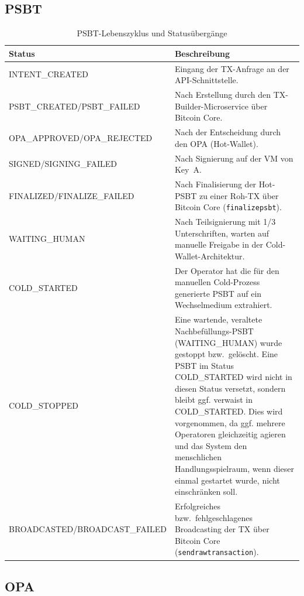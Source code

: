 \subsection{PSBT}

\begin{table}[H]
\centering
\footnotesize
\renewcommand{\arraystretch}{1.3}
\begin{tabularx}{\linewidth}{@{} >{\ttfamily\RaggedRight}p{5.0cm} >{\RaggedRight}X @{}}
\toprule
\textbf{\normalfont Status} & \textbf{Beschreibung} \\
\midrule
INTENT\_CREATED & Eingang der \ac{TX}-Anfrage an der \ac{API}-Schnittstelle. \\
\addlinespace
PSBT\_CREATED/PSBT\_FAILED & Nach Erstellung durch den TX-Builder-Microservice über Bitcoin Core. \\
\addlinespace
OPA\_APPROVED/OPA\_REJECTED & Nach der Entscheidung durch den \ac{OPA} (Hot-Wallet). \\
\addlinespace
SIGNED/SIGNING\_FAILED & Nach Signierung auf der \ac{VM} von Key~A. \\
\addlinespace
FINALIZED/FINALIZE\_FAILED & Nach Finalisierung der Hot-\ac{PSBT} zu einer Roh-\ac{TX} über Bitcoin Core (\texttt{finalizepsbt}). \\
\addlinespace
WAITING\_HUMAN & Nach Teilsignierung mit 1/3 Unterschriften, warten auf manuelle Freigabe in der Cold-Wallet-Architektur. \\
\addlinespace
COLD\_STARTED & Der Operator hat die für den manuellen Cold-Prozess generierte \ac{PSBT} auf ein Wechselmedium extrahiert. \\
\addlinespace
COLD\_STOPPED & Eine wartende, veraltete Nachbefüllungs-\ac{PSBT} (WAITING\_HUMAN) wurde gestoppt bzw.\ gelöscht. Eine \ac{PSBT} im Status COLD\_STARTED wird nicht in diesen Status versetzt, sondern bleibt ggf. verwaist in COLD\_STARTED. Dies wird vorgenommen, da ggf. mehrere Operatoren gleichzeitig agieren und das System den menschlichen Handlungsspielraum, wenn dieser einmal gestartet wurde, nicht einschränken soll. \\
\addlinespace
BROADCASTED/BROADCAST\_FAILED & Erfolgreiches bzw.\ fehlgeschlagenes Broadcasting der \ac{TX} über Bitcoin Core (\texttt{sendrawtransaction}). \\
\bottomrule
\end{tabularx}
\caption{PSBT-Lebenszyklus und Statusübergänge}
\label{tab:psbt_states}
\end{table}


\subsection{\ac{OPA}}

